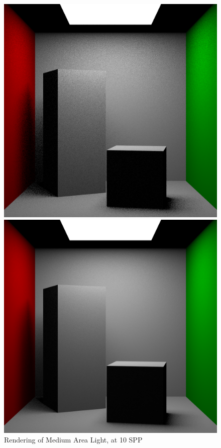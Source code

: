 \documentclass[a4paper]{myarticle}
\begin{document}
\begin{figure}[H]
  \begin{minipage}[t]{.3\textwidth}
      \centering
      \includegraphics[width=\textwidth]{q3/med_2_10.png}
      \caption{Rendering of Medium Area Light, at 10 SPP}
  \end{minipage}
  \hfill
  \begin{minipage}[t]{.3\textwidth}
      \centering
      \includegraphics[width=\textwidth]{q3/med_2_100.png}

\end{minipage}
\end{figure}
\end{document}
